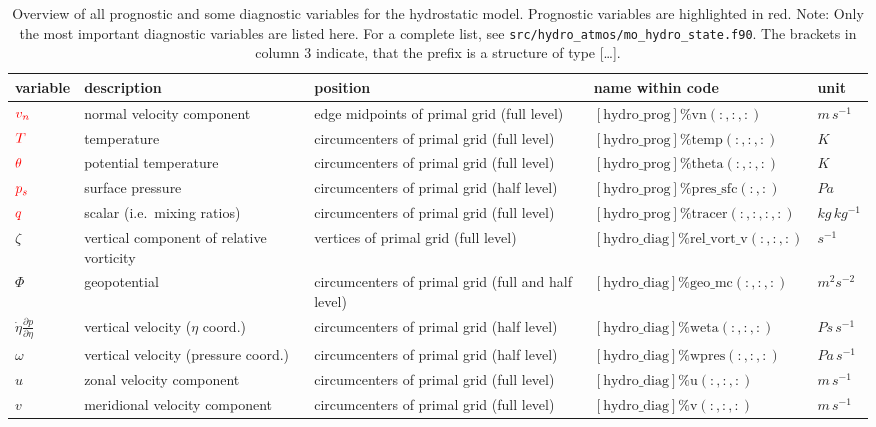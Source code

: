 \documentclass[a4paper,11pt,DIV16,BCOR1cm,titlepage]{scrartcl}
\begin{document}
\begin{table}[!h]
\renewcommand{\arraystretch}{1.4}
\small
\begin{center}
\begin{tabular}{|p{1.4cm}|p{2.9cm}|p{4.1cm}|p{4.4cm}|p{1.2cm}|}
\hline
\textbf{variable}  & \textbf{description}  &\textbf{position}         & \textbf{name within code}  & \textbf{unit}\\ 
\hline\hline
${\color{red}v_{n}}$    & normal velocity component  & edge midpoints of primal grid (full level)& $\mathrm{[hydro\_prog]\%vn(:,:,:)}$ & $m\,s^{-1}$\\ 
${\color{red}T}$        & temperature                & circumcenters of primal grid (full level)& $\mathrm{[hydro\_prog]\%temp(:,:,:)}$ & $K$\\ 
${\color{red}\theta}$   & potential temperature      & circumcenters of primal grid (full level)& $\mathrm{[hydro\_prog]\%theta(:,:,:)}$ & $K$\\
${\color{red}p_{s}}$    & surface pressure           & circumcenters of primal grid (half level)&  $\mathrm{[hydro\_prog]\%pres\_sfc(:,:)}$ & $Pa$\\
${\color{red}q}$        & scalar (i.e.\ mixing ratios) & circumcenters of primal grid (full level)& $\mathrm{[hydro\_prog]\%tracer(:,:,:,:)}$ & $kg\,kg^{-1}$\\
$\zeta$      & vertical component of relative vorticity  & vertices of primal grid (full level)& $\mathrm{[hydro\_diag]\%rel\_vort\_v(:,:,:)}$ &$ s^{-1}$\\ 
$\Phi$     & geopotential               & circumcenters of primal grid (full and half level)& $\mathrm{[hydro\_diag]\%geo\_mc(:,:,:)}$ & $m^{2}s^{-2}$\\
$\dot{\eta}\frac{\partial p}{\partial \eta}$ & vertical velocity ($\eta$ coord.) & circumcenters of primal grid (half level)&  $\mathrm{[hydro\_diag]\%weta(:,:,:)}$ & $Ps\,s^{-1}$\\
$\omega$ & vertical velocity (pressure coord.) & circumcenters of primal grid (half level)&  $\mathrm{[hydro\_diag]\%wpres(:,:,:)}$ & $Pa\,s^{-1}$\\
$u$                     & zonal velocity component   & circumcenters of primal grid (full level)& $\mathrm{[hydro\_diag]\%u(:,:,:)}$ & $m\,s^{-1}$\\ 
$v$                     & meridional velocity component   & circumcenters of primal grid (full level)& $\mathrm{[hydro\_diag]\%v(:,:,:)}$ & $m\,s^{-1}$\\
\hline
\end{tabular}
\caption{Overview of all prognostic and some diagnostic variables for the hydrostatic 
model. Prognostic variables are highlighted in red. Note: Only the most important 
diagnostic variables are listed here. For a complete list, see 
\texttt{src/hydro\_atmos/mo\_hydro\_state.f90}. The brackets in column $3$ indicate, that 
the prefix is a structure of type [\dots].}\label{tbl:variables_nonhydro_model}
\end{center}
\end{table}
\normalsize
\end{document}
